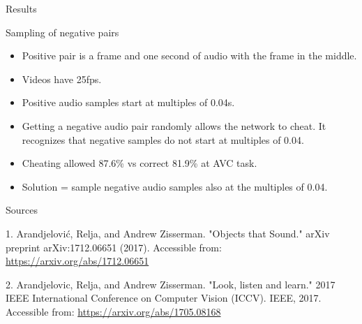 \documentclass{beamer}
\begin{document}
\begin{frame}{Results}


\end{frame}
\begin{frame}{Sampling of negative pairs}

\begin{itemize}
\item Positive pair is a frame and one second of audio with the frame in the middle.
\item Videos have 25fps.
\item Positive audio samples start at multiples of 0.04s.
\item Getting a negative audio pair randomly allows the network to cheat. It recognizes that negative samples do not start at multiples of 0.04.
\item Cheating allowed 87.6\% vs correct 81.9\% at AVC task.
\item Solution = sample negative audio samples also at the multiples of 0.04.
\end{itemize}
 



\end{frame}

\begin{frame}{Sources}

\begin{thebibliography}{0}

   1. Arandjelović, Relja, and Andrew Zisserman. "Objects that Sound." arXiv preprint arXiv:1712.06651 (2017). Accessible from: \url{https://arxiv.org/abs/1712.06651}
  
   2. Arandjelovic, Relja, and Andrew Zisserman. "Look, listen and learn." 2017 IEEE International Conference on Computer Vision (ICCV). IEEE, 2017. Accessible from: \url{https://arxiv.org/abs/1705.08168}
\end{thebibliography}
\end{frame}
 
 
 
\end{document}
